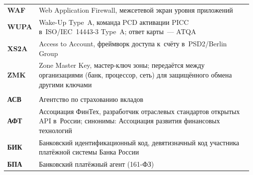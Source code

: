 \begin{longtable}{@{}p{4.5em}p{\dimexpr\linewidth-4.5em-2\tabcolsep\relax}@{}}
  \textbf{WAF}               & Web Application Firewall, межсетевой экран уровня приложений                                                                                                                                                                                                                                     \\
  \textbf{WUPA}              & Wake-Up Type~A, команда PCD активации PICC в~ISO/IEC~14443-3 Type~A; ответ карты~--- ATQA                                                                                                                                                                                                       \\
  \textbf{XS2A}              & Access to Account, фреймворк доступа к~счёту в~PSD2/Berlin Group                                                                                                                                                                                                                                 \\
  \textbf{ZMK}               & Zone Master Key, мастер-ключ зоны; передаётся между организациями (банк, процессор, сеть) для защищённого обмена другими ключами                                                                                                                                                                 \\
  \\
  \textbf{АСВ}               & Агентство по страхованию вкладов                                                                                                                                                                                                                                                                 \\
  \textbf{АФТ}               & Ассоциация ФинТех, разработчик отраслевых стандартов открытых API в~России; синонимы: Ассоциация развития финансовых технологий                                                                                                                                                                  \\
  \textbf{БИК}               & Банковский идентификационный код, девятизначный код участника платёжной системы Банка России                                                                                                                                                                                                     \\
  \textbf{БПА}               & Банковский платёжный агент (161-ФЗ)                                                                                                                                                                                                                                                              \\

\end{longtable}
